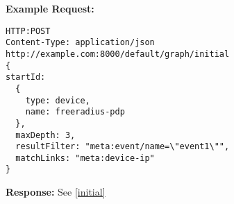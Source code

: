 \begin{minipage}{\linewidth}
\textbf{Example Request:}
\begin{lstlisting}
HTTP:POST
Content-Type: application/json
http://example.com:8000/default/graph/initial
{
startId:
  {
    type: device,
    name: freeradius-pdp
  },
  maxDepth: 3,
  resultFilter: "meta:event/name=\"event1\"",
  matchLinks: "meta:device-ip"
}
\end{lstlisting}
\end{minipage}

\begin{minipage}{\linewidth}
\textbf{Response:}
See \ref{initial}
\end{minipage}
